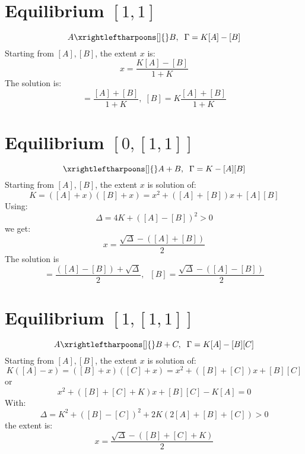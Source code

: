 \documentclass[aps,12pt]{revtex4}
\begin{document}
\section{Equilibrium $[1,1]$}
\begin{equation}
	A \xrightleftharpoons[]{} B, \;\; \Gamma = K[A]-[B]
\end{equation}
Starting from $[A],[B]$, the extent $x$ is:
\begin{equation}
	x = \dfrac{K[A]-[B]}{1+K}
\end{equation}
The solution is:
\begin{equation}
	[A] = \dfrac{[A]+[B]}{1+K}, \; [B] = K \dfrac{ [A]+[B] }{1+K}
\end{equation}


\section{Equilibrium $[0,[1,1]]$}
\begin{equation}
	\xrightleftharpoons[]{} A+B, \;\; \Gamma = K - [A][B]
\end{equation}
Starting from $[A],[B]$, the extent $x$ is solution of:
\begin{equation}
	K = ([A]+x)([B]+x) = x^2 + ([A]+[B])x + [A][B]
\end{equation}
Using:
\begin{equation}
	\Delta = 4K + ([A]-[B])^2 > 0
\end{equation}
we get:
\begin{equation}
	x = \dfrac{\sqrt{\Delta}-([A]+[B])}{2}
\end{equation}
The solution is
\begin{equation}
	[A] =  \dfrac{([A]-[B])+\sqrt{\Delta}}{2},\;\;[B] = \dfrac{\sqrt{\Delta}-([A]-[B])}{2}
\end{equation}

\section{Equilibrium $[1,[1,1]]$}
\begin{equation}
	A\xrightleftharpoons[]{} B+C, \;\; \Gamma = K[A] - [B][C]
\end{equation}
Starting from $[A],[B]$, the extent $x$ is solution of:
\begin{equation}
	K([A]-x) = ([B]+x)([C]+x) = x^2 + ([B]+[C])x + [B][C]
\end{equation}
or
\begin{equation}
	x^2 + ([B]+[C]+K) x + [B][C]-K[A] = 0	
\end{equation}
With:
\begin{equation}
	\Delta = K^2 + ([B]-[C])^2 + 2K(2[A]+[B]+[C]) > 0
\end{equation}
the extent is:
\begin{equation}
	x = \dfrac{\sqrt{\Delta} - ([B]+[C]+K) }{2}
\end{equation}
\end{document}
